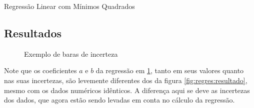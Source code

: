     \begin{listing}[H]
        \caption{Regressão Linear com Mínimos Quadrados}
        \label{code:incert:regres}

    \end{listing}


\subsection{Resultados}

    \begin{figure}[H]
        \centering
        

        \caption{Exemplo de baras de incerteza}
        \label{fig:incert:resultado}
    \end{figure}

    \begin{nota}
        Note que os coeficientes $a$ e $b$ da regressão em \ref{fig:incert:resultado}, tanto em seus valores quanto nas suas incertezas, são levemente diferentes dos da figura \ref{fig:regres:resultado}, mesmo com os dados numéricos idênticos. A diferença aqui se deve as incertezas dos dados, que agora estão sendo levadas em conta no cálculo da regressão.
    \end{nota}
